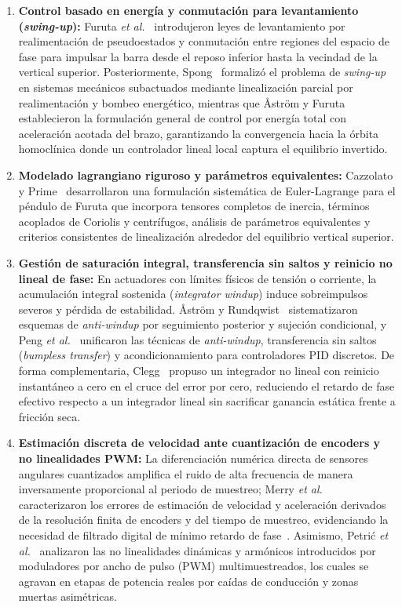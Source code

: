 \begin{enumerate}
    \item \textbf{Control basado en energía y conmutación para levantamiento (\textit{swing-up}):} Furuta \textit{et al.}~\cite{furuta1991} introdujeron leyes de levantamiento por realimentación de pseudoestados y conmutación entre regiones del espacio de fase para impulsar la barra desde el reposo inferior hasta la vecindad de la vertical superior. Posteriormente, Spong~\cite{spong1995} formalizó el problema de \textit{swing-up} en sistemas mecánicos subactuados mediante linealización parcial por realimentación y bombeo energético, mientras que Åström y Furuta~\cite{astrom2000} establecieron la formulación general de control por energía total con aceleración acotada del brazo, garantizando la convergencia hacia la órbita homoclínica donde un controlador lineal local captura el equilibrio invertido.

    \item \textbf{Modelado lagrangiano riguroso y parámetros equivalentes:} Cazzolato y Prime~\cite{cazzolato2011} desarrollaron una formulación sistemática de Euler-Lagrange para el péndulo de Furuta que incorpora tensores completos de inercia, términos acoplados de Coriolis y centrífugos, análisis de parámetros equivalentes y criterios consistentes de linealización alrededor del equilibrio vertical superior.

    \item \textbf{Gestión de saturación integral, transferencia sin saltos y reinicio no lineal de fase:} En actuadores con límites físicos de tensión o corriente, la acumulación integral sostenida (\textit{integrator windup}) induce sobreimpulsos severos y pérdida de estabilidad. Åström y Rundqwist~\cite{AstromAntiwindup1989} sistematizaron esquemas de \textit{anti-windup} por seguimiento posterior y sujeción condicional, y Peng \textit{et al.}~\cite{Peng1996} unificaron las técnicas de \textit{anti-windup}, transferencia sin saltos (\textit{bumpless transfer}) y acondicionamiento para controladores PID discretos. De forma complementaria, Clegg~\cite{clegg1958} propuso un integrador no lineal con reinicio instantáneo a cero en el cruce del error por cero, reduciendo el retardo de fase efectivo respecto a un integrador lineal sin sacrificar ganancia estática frente a fricción seca.

    \item \textbf{Estimación discreta de velocidad ante cuantización de encoders y no linealidades PWM:} La diferenciación numérica directa de sensores angulares cuantizados amplifica el ruido de alta frecuencia de manera inversamente proporcional al periodo de muestreo; Merry \textit{et al.}~\cite{Merry2010} caracterizaron los errores de estimación de velocidad y aceleración derivados de la resolución finita de encoders y del tiempo de muestreo, evidenciando la necesidad de filtrado digital de mínimo retardo de fase~\cite{Oppenheim2010,Astrom1997}. Asimismo, Petrić \textit{et al.}~\cite{Petric2022} analizaron las no linealidades dinámicas y armónicos introducidos por moduladores por ancho de pulso (PWM) multimuestreados, los cuales se agravan en etapas de potencia reales por caídas de conducción y zonas muertas asimétricas.
\end{enumerate}

